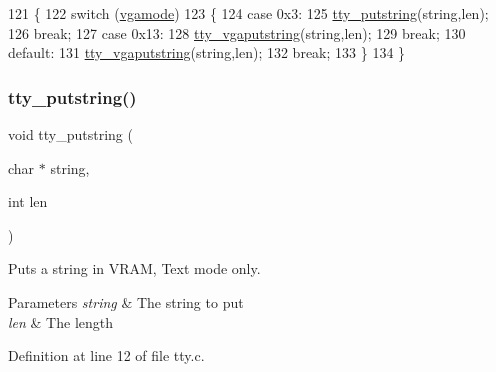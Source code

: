 \begin{DoxyCode}
121                                             \{
122     \textcolor{keywordflow}{switch} (\hyperlink{a00179_af93b0649fdd1bea5b6d29ed37205aa2c_af93b0649fdd1bea5b6d29ed37205aa2c}{vgamode})
123     \{
124     \textcolor{keywordflow}{case} 0x3:
125         \hyperlink{a00179_a5b5bf610a57f3c59b2851fa2652081ec_a5b5bf610a57f3c59b2851fa2652081ec}{tty\_putstring}(\textcolor{keywordtype}{string},len);
126         \textcolor{keywordflow}{break};
127     \textcolor{keywordflow}{case} 0x13:
128         \hyperlink{a00179_a05ca3f5e64f38fec173b635ca8465415_a05ca3f5e64f38fec173b635ca8465415}{tty\_vgaputstring}(\textcolor{keywordtype}{string},len);
129         \textcolor{keywordflow}{break};
130     \textcolor{keywordflow}{default}:
131         \hyperlink{a00179_a05ca3f5e64f38fec173b635ca8465415_a05ca3f5e64f38fec173b635ca8465415}{tty\_vgaputstring}(\textcolor{keywordtype}{string},len);
132         \textcolor{keywordflow}{break};
133     \}
134 \}
\end{DoxyCode}
\mbox{\label{a00182_a5b5bf610a57f3c59b2851fa2652081ec_a5b5bf610a57f3c59b2851fa2652081ec}} 
\subsubsection{\texorpdfstring{tty\+\_\+putstring()}{tty\_putstring()}}
{\footnotesize\ttfamily void tty\+\_\+putstring (\begin{DoxyParamCaption}\item[{char $\ast$}]{string,  }\item[{int}]{len }\end{DoxyParamCaption})}



Puts a string in V\+R\+AM, Text mode only. 


\begin{DoxyParams}{Parameters}
{\em string} & The string to put \\
\hline
{\em len} & The length \\
\hline
\end{DoxyParams}


Definition at line 12 of file tty.\+c.


